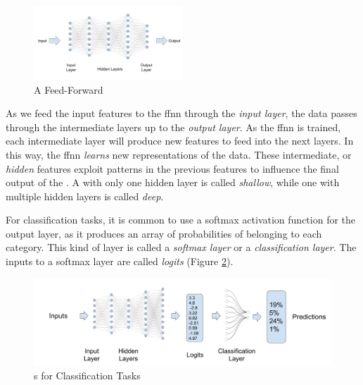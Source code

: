 \begin{figure}
    \centering
    \includegraphics[width=0.5\textwidth]{Figures/02/02_FFNN.png}
    \caption{A Feed-Forward \neuralNetwork{}}
    \label{fig:02_nn_ffnn}
\end{figure}

As we feed the input features to the \gls{ffnn} through the \emph{input layer}, the data passes through the intermediate layers up to the \emph{output layer}. As the \gls{ffnn} is trained, each intermediate layer will produce new features to feed into the next layers. In this way, the \gls{ffnn} \emph{learns} new representations of the data. These intermediate, or \emph{hidden} features exploit patterns in the previous features to influence the final output of the \neuralNetwork{}. A \neuralNetwork{} with only one hidden layer is called \emph{shallow}, while one with multiple hidden layers is called \emph{deep}.

For classification tasks, it is common to use a \gls{softmax} activation function for the output layer, as it produces an array of probabilities of belonging to each category. This kind of layer is called a \emph{\gls{softmax} layer} or a \emph{classification layer}. The inputs to a \gls{softmax} layer are called \emph{logits} (Figure \ref{fig:02_nn_nns_for_classification}).

\begin{figure}
    \centering
    \includegraphics[width=\textwidth]{Figures/02/02_nns_for_classification.png}
    \caption{\neuralNetwork{}s for Classification Tasks}
    \label{fig:02_nn_nns_for_classification}
\end{figure}



